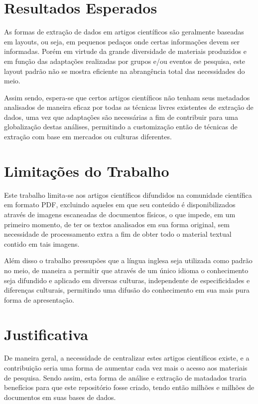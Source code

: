 \documentclass[
	12pt,               %
	openright,          %
	twoside,            %
	a4paper,            %
	english,            %
	brazil              %
	]{abntex2}
\begin{document}
\section{Resultados Esperados}

As formas de extração de dados em artigos científicos são geralmente baseadas em layouts, ou seja, em pequenos pedaços onde certas informações devem ser informadas. Porém em virtude da grande diversidade de materiais produzidos e em função das adaptações realizadas por grupos e/ou eventos de pesquisa, este layout padrão não se mostra eficiente na abrangência total das necessidades do meio. 

Assim sendo, espera-se que certos artigos científicos não tenham seus metadados analisados de maneira eficaz por todas as técnicas livres existentes de extração de dados, uma vez que adaptações são necessárias a fim de contribuir para uma globalização destas análises, permitindo a customização então de técnicas de extração com base em mercados ou culturas diferentes.

\section{Limitações do Trabalho}

Este trabalho limita-se aos artigos científicos difundidos na comunidade científica em formato PDF, excluindo aqueles em que seu conteúdo é disponibilizados através de imagens escaneadas de documentos físicos, o que impede, em um primeiro momento, de ter os textos analisados em sua forma original, sem necessidade de processamento extra a fim de obter todo o material textual contido em tais imagens.

Além disso o trabalho pressupões que a língua inglesa seja utilizada como padrão no meio, de maneira a permitir que através de um único idioma o conhecimento seja difundido e aplicado em diversas culturas, independente de especificidades e diferenças culturais, permitindo uma difusão do conhecimento em sua mais pura forma de apresentação.

\section{Justificativa}

De maneira geral, a necessidade de centralizar estes artigos científicos existe, e a contribuição seria uma forma de aumentar cada vez mais o acesso aos materiais de pesquisa. Sendo assim, esta forma de análise e extração de matadados traria benefícios para que este repositório fosse criado, tendo então milhões e milhões de documentos em suas bases de dados.
\end{document}
